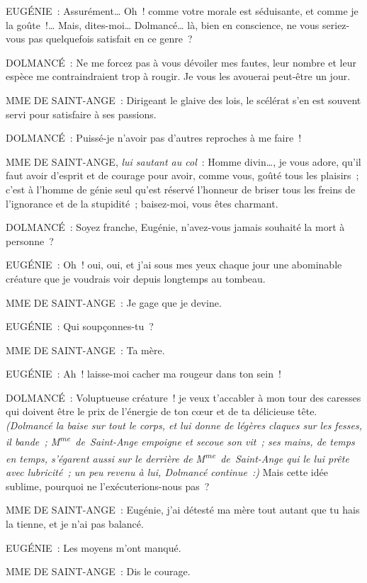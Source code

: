 \documentclass[french,twoside]{book} %
\begin{document}
EUGÉNIE : Assurément… Oh ! comme votre morale est séduisante, et comme je la goûte !… Mais, dites-moi… Dolmancé… là, bien en conscience, ne vous seriez-vous pas quelquefois satisfait en ce genre ?\par
DOLMANCÉ : Ne me forcez pas à vous dévoiler mes fautes, leur nombre et leur espèce me contraindraient trop à rougir. Je vous les avouerai peut-être un jour.\par
MME DE SAINT-ANGE : Dirigeant le glaive des lois, le scélérat s’en est souvent servi pour satisfaire à ses passions.\par
DOLMANCÉ : Puissé-je n’avoir pas d’autres reproches à me faire !\par
MME DE SAINT-ANGE, {\itshape lui sautant au col} : Homme divin…, je vous adore, qu’il faut avoir d’esprit et de courage pour avoir, comme vous, goûté tous les plaisirs ; c’est à l’homme de génie seul qu’est réservé l’honneur de briser tous les freins de l’ignorance et de la stupidité ; baisez-moi, vous êtes charmant.\par
DOLMANCÉ : Soyez franche, Eugénie, n’avez-vous jamais souhaité la mort à personne ?\par
EUGÉNIE : Oh ! oui, oui, et j’ai sous mes yeux chaque jour une abominable créature que je voudrais voir depuis longtemps au tombeau.\par
MME DE SAINT-ANGE : Je gage que je devine.\par
EUGÉNIE : Qui soupçonnes-tu ?\par
MME DE SAINT-ANGE : Ta mère.\par
EUGÉNIE : Ah ! laisse-moi cacher ma rougeur dans ton sein !\par
DOLMANCÉ : Voluptueuse créature ! je veux t’accabler à mon tour des caresses qui doivent être le prix de l’énergie de ton cœur et de ta délicieuse tête. {\itshape (Dolmancé la baise sur tout le corps, et lui donne de légères claques sur les fesses, il bande ; M\textsuperscript{me} de Saint-Ange empoigne et secoue son vit ; ses mains, de temps en temps, s’égarent aussi sur le derrière de M\textsuperscript{me} de Saint-Ange qui le lui prête avec lubricité ; un peu revenu à lui, Dolmancé continue :)} Mais cette idée sublime, pourquoi ne l’exécuterions-nous pas ?\par
MME DE SAINT-ANGE : Eugénie, j’ai détesté ma mère tout autant que tu hais la tienne, et je n’ai pas balancé.\par
EUGÉNIE : Les moyens m’ont manqué.\par
MME DE SAINT-ANGE : Dis le courage.\par
\end{document}
